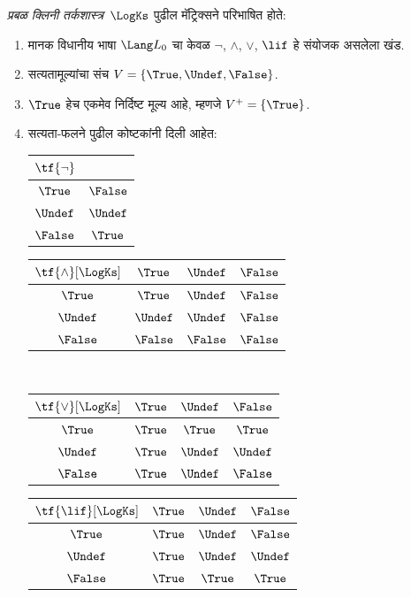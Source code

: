 \begin{defn}
\emph{प्रबळ क्लिनी तर्कशास्त्र}~$\LogKs$ पुढील मॅट्रिक्सने
परिभाषित होते:
\begin{enumerate}
  \item मानक विधानीय भाषा $\Lang L_0$ चा केवळ
  $\lnot$, $\land$, $\lor$, $\lif$ हे संयोजक असलेला खंड.
  \item सत्यतामूल्यांचा संच $V = \{\True, \Undef, \False\}$.
  \item $\True$ हेच एकमेव निर्दिष्ट मूल्य आहे, म्हणजे $V^+ = \{\True\}$.
  \item सत्यता-फलने पुढील कोष्टकांनी दिली आहेत:
  \begin{center}
    \begin{tabular}{c|c}
      $\tf{\lnot}$ & \\
      \hline
      $\True$ & $\False$ \\
      $\Undef$ & $\Undef$ \\
      $\False$ & $\True$
    \end{tabular}
    \quad
    \begin{tabular}{c|ccc}
      $\tf{\land}[\LogKs]$ & $\True$ & $\Undef$ & $\False$ \\
      \hline
      $\True$ & $\True$ & $\Undef$ & $\False$ \\
      $\Undef$ & $\Undef$ & $\Undef$ & $\False$\\
      $\False$ & $\False$ & $\False$ & $\False$
    \end{tabular}
    \\[2ex]
    \begin{tabular}{c|ccc}
      $\tf{\lor}[\LogKs]$ & $\True$ & $\Undef$ & $\False$ \\
      \hline
      $\True$ & $\True$ & $\True$ & $\True$ \\
      $\Undef$ & $\True$ & $\Undef$ & $\Undef$ \\
      $\False$ & $\True$ & $\Undef$ & $\False$
    \end{tabular}
    \quad
    \begin{tabular}{c|ccc}
      $\tf{\lif}[\LogKs]$ & $\True$ & $\Undef$ & $\False$ \\
      \hline
      $\True$ & $\True$ & $\Undef$ & $\False$ \\
      $\Undef$ & $\True$ & $\Undef$ & $\Undef$  \\
      $\False$ & $\True$ & $\True$ & $\True$
    \end{tabular}
  \end{center}
\end{enumerate}
\end{defn}
